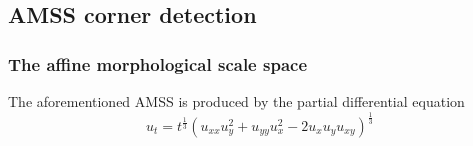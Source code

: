\subsection{AMSS corner detection}

\subsubsection{The affine morphological scale space}

The aforementioned AMSS is produced by the partial differential equation
\[
    u_t = t^\frac{1}{3}(u_{xx}u_y^2 + u_{yy}u_x^2 - 2u_xu_yu_{xy})^\frac{1}{3}
\]






